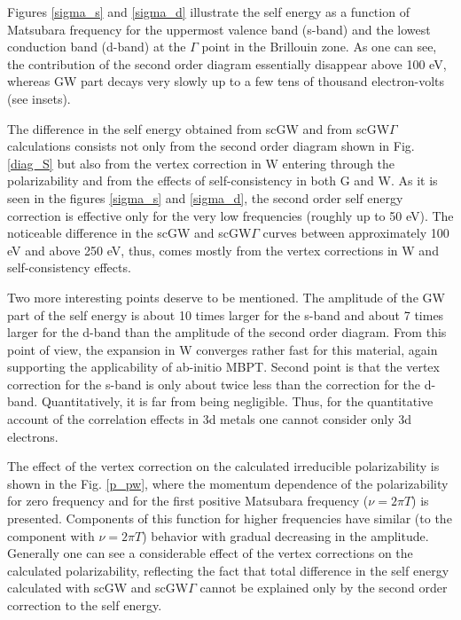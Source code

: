 \documentclass[aps,prb,floatfix,epsfig,twocolumn,preprintnumbers]{revtex4}
\begin{document}
Figures \ref{sigma_s} and \ref{sigma_d} illustrate the self energy as a function of Matsubara frequency for the uppermost valence band (s-band) and the lowest conduction band (d-band) at the $\Gamma$ point in the Brillouin zone. As one can see, the contribution of the second order diagram essentially disappear above 100 eV, whereas GW part decays very slowly up to a few tens of thousand electron-volts (see insets).

The difference in the self energy obtained from scGW and from scGW$\Gamma$ calculations consists not only from the second order diagram shown in Fig. \ref{diag_S} but also from the vertex correction in W entering through the polarizability and from the effects of self-consistency in both G and W. As it is seen in the figures \ref{sigma_s} and \ref{sigma_d}, the second order self energy correction is effective only for the very low frequencies (roughly up to 50 eV). The noticeable difference in the scGW and scGW$\Gamma$ curves between approximately 100 eV and above 250 eV, thus, comes mostly from the vertex corrections in W and self-consistency effects.

Two more interesting points deserve to be mentioned. The amplitude of the GW part of the self energy is about 10 times larger for the s-band and about 7 times larger for the d-band than the amplitude of the second order diagram. From this point of view, the expansion in W converges rather fast for this material, again supporting the applicability of ab-initio MBPT. Second point is that the vertex correction for the s-band is only about twice less than the correction for the d-band. Quantitatively, it is far from being negligible. Thus, for the quantitative account of the correlation effects in 3d metals one cannot consider only 3d electrons.

The effect of the vertex correction on the calculated irreducible polarizability is shown in the Fig. \ref{p_pw}, where the momentum dependence of the polarizability for zero frequency and for the first positive Matsubara frequency ($\nu=2\pi T$) is presented. Components of this function for higher frequencies have similar (to the component with $\nu=2\pi T$) behavior with gradual decreasing in the amplitude. Generally one can see a considerable effect of the vertex corrections on the calculated polarizability, reflecting the fact that total difference in the self energy calculated with scGW and scGW$\Gamma$ cannot be explained only by the second order correction to the self energy.
\end{document}

